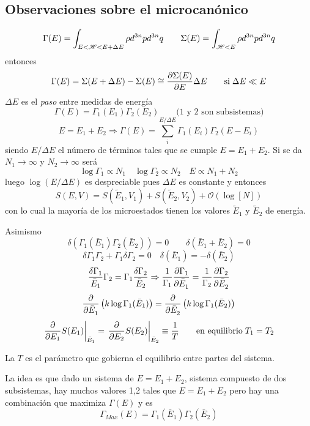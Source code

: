 \documentclass[10pt,oneside]{CBFT_book}
\begin{document}
\subsection{Observaciones sobre el microcanónico}

\[
	\Gamma(E) = \int_{E < \mathscr{H} < E + \Delta E} \rho d^{3n}p d^{3n}q \qquad 
	\Sigma(E) = \int_{\mathscr{H} < E} \rho d^{3n}p d^{3n}q
\]
entonces 
\[
	\Gamma(E) = \Sigma( E + \Delta E ) - \Sigma( E ) \cong \frac{\partial^{\hspace{-0.05em}} {\Sigma( E )}}{\partial {E}^{\hspace{-0.05em}}}\Delta E  
	\qquad \text{si}\; \Delta E \ll E
\]
$\Delta E$ es el {\it paso} entre medidas de energía 
\[
	\Gamma(E) = \Gamma_1(E_1) \Gamma_2(E_2) \qquad \text{(1 y 2 son subsistemas)}
\]
\[
	E = E_1 + E_2 \Rightarrow \Gamma(E) = \sum_i^{E/\Delta E} \Gamma_1(E_i)\Gamma_2(E-E_i)
\]
siendo $E/\Delta E$ el número de términos tales que se cumple $ E = E_1 + E_2 $.
Si se da $ N_1 \to \infty $ y $ N_2 \to \infty $ será
\[
	\log \Gamma_1 \propto N_1 \quad \log \Gamma_2 \propto N_2 \quad E \propto N_1 + N_2
\]
luego $\log(E/\Delta E)$ es despreciable pues $\Delta E$ es constante y entonces
\[
	S(E,V) = S(\tilde{E}_1,V_1) + S(\tilde{E}_2,V_2) + \mathcal{O}(\log[N])
\]
con lo cual la mayoría de los microestados tienen los valores $\tilde{E}_1$ y $\tilde{E}_2$ de energía.

Asimismo
\[
	\delta( \Gamma_1(\bar{E}_1)  \Gamma_2(\bar{E}_2) ) = 0 \qquad \delta( \bar{E}_1 + \bar{E}_2 ) = 0
\]
\[
	\delta\Gamma_1 \Gamma_2 + \Gamma_1 \delta \Gamma_2 = 0 \quad \delta( \bar{E}_1 ) = -\delta ( \bar{E}_2 )
\]
\[
	\frac{\delta\Gamma_1}{\bar{E}_1}\Gamma_2 = \Gamma_1\frac{\delta\Gamma_2}{\bar{E}_2} \Rightarrow 
	\frac{1}{\Gamma_1} \frac{\partial^{\hspace{-0.05em}} {\Gamma_1}}{\partial {\bar{E}_1}^{\hspace{-0.05em}}} = \frac{1}{\Gamma_2} \frac{\partial^{\hspace{-0.05em}} {\Gamma_2}}{\partial {\bar{E}_2}^{\hspace{-0.05em}}} 
\]
\[
	\frac{\partial^{\hspace{-0.05em}} {}}{\partial {\bar{E}_1}^{\hspace{-0.05em}}}\left( k\log \Gamma_1(\bar{E}_1) \right) = 
	\frac{\partial^{\hspace{-0.05em}} {}}{\partial {\bar{E}_2}^{\hspace{-0.05em}}}\left( k\log \Gamma_1(\bar{E}_2) \right)
\]
\[
	\left. \frac{\partial^{\hspace{-0.05em}} {}}{\partial {{E}_1}^{\hspace{-0.05em}}}S(E_1)\right|_{\bar{E}_1} = \left. \frac{\partial^{\hspace{-0.05em}} {}}{\partial {{E}_2}^{\hspace{-0.05em}}}S(E_2)\right|_{\bar{E}_2}
	\equiv \frac{1}{T} \qquad \text{en equilibrio} \; T_1 = T_2
\]

La $T$ es el parámetro que gobierna el equilibrio entre partes del sistema.

La idea es que dado un sistema de $E = E_1 + E_2$, sistema compuesto de dos subsistemas, hay muchos valores
1,2 tales que $E = E_1 + E_2$ pero hay una combinación que maximiza $\Gamma(E)$ y es
\[
	\Gamma_{Max}(E) = \Gamma_1(\bar{E}_1)  \Gamma_2(\bar{E}_2) 
\]
\end{document}
